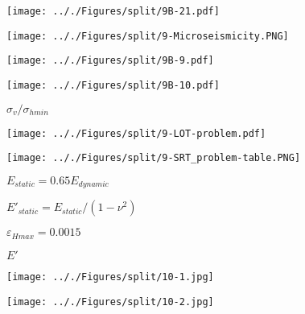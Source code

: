 \documentclass[onecolumn,11pt]{report}
\def\lthtmlcheckvsize{\ifdim\ht\sizebox<\vsize 
  \ifdim\wd\sizebox<\hsize\expandafter\hfill\fi \expandafter\vfill
  \else\expandafter\vss\fi}%
\begin{document}
{\newpage\clearpage
{}%
\texttt{[image: .././Figures/split/9B-21.pdf]}%
\lthtmlpictureZ
\lthtmlcheckvsize\clearpage}

{\newpage\clearpage
{}%
\texttt{[image: .././Figures/split/9-Microseismicity.PNG]}%
\lthtmlpictureZ
\lthtmlcheckvsize\clearpage}

{\newpage\clearpage
{}%
\texttt{[image: .././Figures/split/9B-9.pdf]}%
\lthtmlpictureZ
\lthtmlcheckvsize\clearpage}

{\newpage\clearpage
{}%
\texttt{[image: .././Figures/split/9B-10.pdf]}%
\lthtmlpictureZ
\lthtmlcheckvsize\clearpage}

{\newpage\clearpage
{}%
$ \sigma_v / \sigma_{hmin}$%
\lthtmlindisplaymathZ
\lthtmlcheckvsize\clearpage}

{\newpage\clearpage
{}%
\texttt{[image: .././Figures/split/9-LOT-problem.pdf]}%
\lthtmlpictureZ
\lthtmlcheckvsize\clearpage}

{\newpage\clearpage
{}%
\texttt{[image: .././Figures/split/9-SRT\_problem-table.PNG]}%
\lthtmlpictureZ
\lthtmlcheckvsize\clearpage}

{\newpage\clearpage
{}%
$ E_{static} = 0.65 E_{dynamic}$%
\lthtmlindisplaymathZ
\lthtmlcheckvsize\clearpage}

{\newpage\clearpage
{}%
$ E'_{static} = E_{static} / (1-\nu^2)$%
\lthtmlindisplaymathZ
\lthtmlcheckvsize\clearpage}

{\newpage\clearpage
{}%
$ \varepsilon_{Hmax} = 0.0015$%
\lthtmlindisplaymathZ
\lthtmlcheckvsize\clearpage}

{\newpage\clearpage
{}%
$ E'$%
\lthtmlindisplaymathZ
\lthtmlcheckvsize\clearpage}

{\newpage\clearpage
{}%
\texttt{[image: .././Figures/split/10-1.jpg]}%
\lthtmlpictureZ
\lthtmlcheckvsize\clearpage}

{\newpage\clearpage
{}%
\texttt{[image: .././Figures/split/10-2.jpg]}%
\lthtmlpictureZ
\lthtmlcheckvsize\clearpage}
\end{document}
